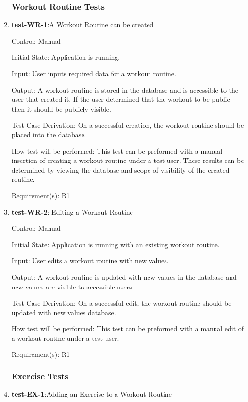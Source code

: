 \documentclass[12pt, titlepage]{article}
\begin{document}
	\begin{enumerate}
		
		\subsubsection{Workout Routine Tests}
		\item{\textbf{test-WR-1}}:A Workout Routine can be created
		
		Control: Manual
		
		Initial State: Application is running.
		
		Input: User inputs required data for a workout routine.
		
		Output: A workout routine is stored in the database and is accessible to the user that created it. If the user determined that the workout to be public then it should be publicly visible.
		
		Test Case Derivation: On a successful creation, the workout routine should be placed into the database.
		
		How test will be performed: This test can be preformed with a manual insertion of creating a workout routine under a test user. These results can be determined by viewing the database and scope of visibility of the created routine.
		
		Requirement(s): R1
		
		\item{\textbf{test-WR-2}}: Editing a Workout Routine
		
		Control: Manual
		
		Initial State: Application is running with an existing workout routine.
		
		Input: User edits a workout routine with new values.
		
		Output: A workout routine is updated with new values in the database and new values are visible to accessible users.
		
		Test Case Derivation: On a successful edit, the workout routine should be updated with new values database.
		
		How test will be performed: This test can be preformed with a manual edit of a workout routine under a test user.
		
		Requirement(s): R1
		
		\subsubsection{Exercise Tests}
		\item{\textbf{test-EX-1}}:Adding an Exercise to a Workout Routine


\end{enumerate}
\end{document}
